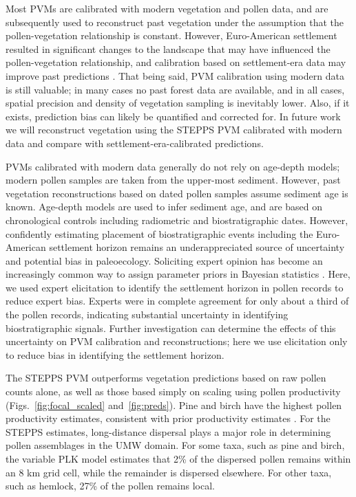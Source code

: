 \documentclass[12pt]{article}
\begin{document}
Most PVMs are calibrated with modern vegetation and pollen data, and
are subsequently used to reconstruct past vegetation under the
assumption that the pollen-vegetation relationship is
constant. However, Euro-American settlement resulted in significant
changes to the landscape that may have influenced the
pollen-vegetation relationship, and calibration based on
settlement-era data may improve past predictions \citep{kujawa2016,
  st2014bias}. That being said, PVM calibration using modern data is
still valuable; in many cases no past forest data are available, and
in all cases, spatial precision and density of vegetation sampling is
inevitably lower.  Also, if it exists, prediction bias can likely be
quantified and corrected for. In future work we will reconstruct
vegetation using the STEPPS PVM calibrated with modern data and
compare with settlement-era-calibrated predictions.

PVMs calibrated with modern data generally do not rely on age-depth
models; modern pollen samples are taken from the upper-most
sediment. However, past vegetation reconstructions based on dated
pollen samples assume sediment age is known. Age-depth models are used
to infer sediment age, and are based on chronological controls
including radiometric and biostratigraphic dates. However, confidently
estimating placement of biostratigraphic events including the
Euro-American settlement horizon remains an underappreciated source of
uncertainty and potential bias in paleoecology. Soliciting expert
opinion has become an increasingly common way to assign parameter
priors in Bayesian statistics \citep{choy2009elicitation}. Here, we
used expert elicitation to identify the settlement horizon in pollen
records to reduce expert bias. Experts were in complete agreement for
only about a third of the pollen records, indicating substantial
uncertainty in identifying biostratigraphic signals. Further
investigation can determine the effects of this uncertainty on PVM
calibration and reconstructions; here we use elicitation only to
reduce bias in identifying the settlement horizon.

The STEPPS PVM outperforms vegetation predictions based on raw pollen
counts alone, as well as those based simply on scaling using pollen
productivity (Figs.~\ref{fig:focal_scaled} and~\ref{fig:preds}). Pine
and birch have the highest pollen productivity estimates, consistent
with prior productivity estimates \citep{bradshaw1985relationships,
  prentice1986}. For the STEPPS estimates, long-distance dispersal
plays a major role in determining pollen assemblages in the UMW
domain. For some taxa, such as pine and birch, the variable PLK model
estimates that 2\% of the dispersed pollen remains within an 8 km grid
cell, while the remainder is dispersed elsewhere. For other taxa, such
as hemlock, 27\% of the pollen remains local.
\end{document}
